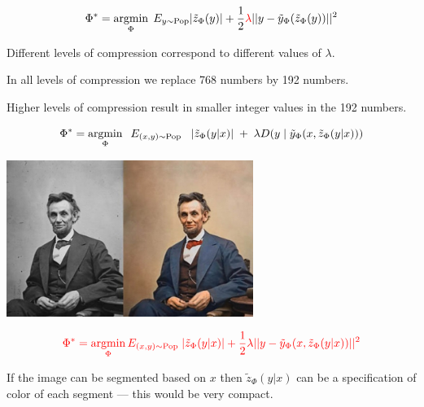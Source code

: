 {

$$\Phi^* = \operatorname*{argmin}_\Phi\; E_{y \sim \mathrm{Pop}} |\tilde{z}_\Phi(y)| + \frac{1}{2}{\color{red} \lambda} ||y - \tilde{y}_\Phi(\tilde{z}_\Phi(y))||^2$$

\vfill
Different levels of compression correspond to different values of $\lambda$.

\vfill
In all levels of compression we replace 768 numbers by 192 numbers.

\vfill
Higher levels of compression result in smaller integer values in the 192 numbers.


$$\Phi^* = \operatorname*{argmin}_\Phi \;\;E_{(x,y) \sim \mathrm{Pop}} \;\;\; |\tilde{z}_\Phi(y|x)|\; + \; \lambda D(y\;|\;\tilde{y}_\Phi(x,\tilde{z}_\Phi(y|x)))$$


\centerline{\includegraphics[height = 2in]{../images/colorization}}

\vfill
$${\color{red} \Phi^* = \operatorname*{argmin}_\Phi E_{(x,y) \sim \mathrm{Pop}}\;|\tilde{z}_\Phi(y|x)| + \frac{1}{2}\lambda ||y - \tilde{y}_\Phi(x,\tilde{z}_\Phi(y|x))||^2}$$

\vfill
If the image can be segmented based on $x$ then $\tilde{z}_\Phi(y|x)$ can be a specification of color of each segment --- this would be very compact.



}


